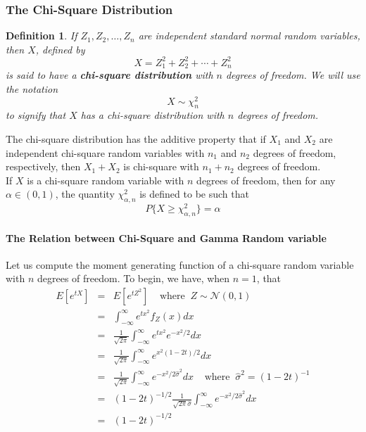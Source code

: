 \documentclass[12pt]{article}
\newtheorem{definition}[theorem]{Definition}
\begin{document}
\subsubsection{The Chi-Square Distribution}

\begin{definition}
  If $Z_1, Z_2, \dots, Z_n$ are independent standard normal random variables, then $X$, defined by
  \begin{equation*}
    X = Z_1^2 + Z_2^2 + \cdots + Z_n^2
  \end{equation*}
  is said to have a \textbf{chi-square distribution} with $n$ degrees of freedom. We will use the notation
  \begin{equation*}
    X \sim \chi_n^2
  \end{equation*}
  to signify that $X$ has a chi-square distribution with $n$ degrees of freedom.
\end{definition}

The chi-square distribution has the additive property that if $X_1$ and $X_2$ are independent chi-square random variables with $n_1$ and $n_2$ degrees of freedom, respectively, then $X_1 + X_2$ is chi-square with $n_1+n_2$ degrees of freedom. \\

If $X$ is a chi-square random variable with $n$ degrees of freedom, then for any $\alpha \in (0,1)$, the quantity $\chi_{\alpha,n}^2$ is defined to be such that
\begin{equation*}
  P \{ X \ge \chi_{\alpha,n}^2 \} = \alpha
\end{equation*}

\paragraph{The Relation between Chi-Square and Gamma Random variable}

Let us compute the moment generating function of a chi-square random variable with $n$ degrees of freedom. To begin, we have, when $n=1$, that
\begin{eqnarray*}
  E[e^{tX}]
  &=& E[e^{tZ^2}] \;\;\;\; \text{where} \;\; Z \sim \mathcal{N}(0,1) \\
  &=& \int_{-\infty}^{\infty} e^{tx^2} f_Z(x) dx \\
  &=& \frac{1}{\sqrt{2 \pi}} \int_{-\infty}^{\infty} e^{tx^2} e^{-x^2/2} dx \\
  &=& \frac{1}{\sqrt{2 \pi}} \int_{-\infty}^{\infty} e^{x^2(1-2t)/2} dx \\
  &=& \frac{1}{\sqrt{2 \pi}} \int_{-\infty}^{\infty} e^{-x^2/2\hat{\sigma}^2} dx
  \;\;\;\; \text{where} \;\; \hat{\sigma}^2 = (1-2t)^{-1} \\
  &=& (1-2t)^{-1/2} \frac{1}{\sqrt{2\pi} \hat{\sigma}}
  \int_{-\infty}^{\infty} e^{-x^2/2\hat{\sigma}^2} dx \\
  &=& (1-2t)^{-1/2}
\end{eqnarray*}
\end{document}
